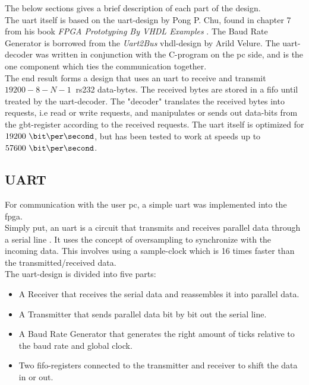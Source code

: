 \documentclass[main.tex]{subfiles}
\begin{document}
The below sections gives a brief description of each part of the design.\\
The \gls{uart} itself is based on the \gls{uart}-design by Pong P. Chu, found in chapter 7 from his book \textit{FPGA Prototyping By VHDL Examples} \cite{chu08}. The Baud Rate Generator is borrowed from the \textit{Uart2Bus} \acrshort{vhdl}-design by Arild Velure. The \gls{uart}-decoder was written in conjunction with the C-program on the \acrshort{pc} side, and is the one component which ties the communication together.\\

The end result forms a design that uses an \gls{uart} to receive and transmit $19200-8-N-1~$ \acrshort{rs232} data-bytes. The received bytes are stored in a \gls{fifo} until treated by the \gls{uart}-decoder. The "decoder" translates the received bytes into requests, i.e read or write requests, and manipulates or sends out data-bits from the \gls{gbt}-register according to the received requests. The \gls{uart} itself is optimized for $19200~\bit\per\second$, but has been tested to work at speeds up to $57600~\bit\per\second$.

\subsection{UART}
For communication with the user \acrshort{pc}, a simple \gls{uart} was implemented into the \gls{fpga}.\\
Simply put, an \gls{uart} is a circuit that transmits and receives parallel data through a serial line \cite{chu08}. It uses the concept of oversampling to synchronize with the incoming data. This involves using a sample-clock which is 16 times faster than the transmitted/received data.\\

The \gls{uart}-design is divided into five parts:
\begin{itemize}
\item A Receiver that receives the serial data and reassembles it into parallel data.
\item A Transmitter that sends parallel data bit by bit out the serial line.
\item A Baud Rate Generator that generates the right amount of ticks relative to the baud rate and global clock.
\item Two \gls{fifo}-registers connected to the transmitter and receiver to shift the data in or out.
\end{itemize}
\end{document}
